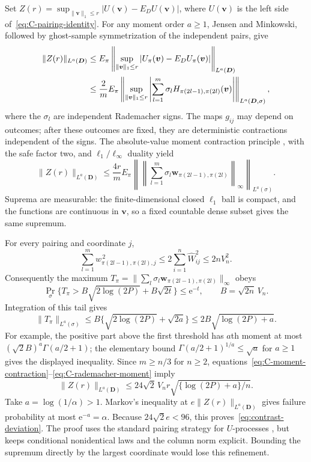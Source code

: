 Set $Z(r)=\sup_{\|\bm{v}\|_1\le r}|U(\bm{v})-E_DU(\bm{v})|$, where $U(\bm{v})$ is the left side of~\eqref{eq:C-pairing-identity}. For any moment order $a\ge1$, Jensen and Minkowski, followed by ghost-sample symmetrization of the independent pairs, give
\begin{align}
 \|Z(r)\|_{L^a(\bm{D})}
 &\le E_\pi\left\|\sup_{\|\bm{v}\|_1\le r}|U_\pi(\bm{v})-E_DU_\pi(\bm{v})|\right\|_{L^a(\bm{D})}\notag\\
 &\le\frac2m E_\pi\left\|\sup_{\|\bm{v}\|_1\le r}
          \left|\sum_{l=1}^m\sigma_l H_{\pi(2l-1),\pi(2l)}(\bm{v})\right|
                    \right\|_{L^a(\bm{D},\sigma)},
 \label{eq:C-moment-symmetrization}
\end{align}
where the $\sigma_l$ are independent Rademacher signs. The maps $g_{ij}$ may depend on outcomes; after these outcomes are fixed, they are deterministic contractions independent of the signs. The absolute-value moment contraction principle \citep[Chapter~4]{LedouxTalagrand1991}, with the safe factor two, and $\ell_1/\ell_\infty$ duality yield
\begin{equation}
 \|Z(r)\|_{L^a(\bm{D})}
 \le\frac{4r}{m}E_\pi
 \left\|\left\|\sum_{l=1}^m\sigma_l \bm{w}_{\pi(2l-1),\pi(2l)}\right\|_\infty
                                             \right\|_{L^a(\sigma)}.
 \label{eq:C-moment-contraction}
\end{equation}
Suprema are measurable: the finite-dimensional closed $\ell_1$ ball is compact, and the functions are continuous in $\bm{v}$, so a fixed countable dense subset gives the same supremum.

For every pairing and coordinate $j$,
\begin{equation}
 \sum_{l=1}^m w_{\pi(2l-1),\pi(2l),j}^{\,2}
 \le2\sum_{i=1}^n\widehat W_{ij}^2\le2nV_n^2.
 \label{eq:C-matching-column-bound}
\end{equation}
Consequently the maximum $T_\pi=\|\sum_l\sigma_l\bm{w}_{\pi(2l-1),\pi(2l)}\|_\infty$ obeys
\[
 \Pr_\sigma\{T_\pi>B\sqrt{2\log(2P)}+B\sqrt{2t}\}\le \mathrm{e}^{-t},
 \qquad B=\sqrt{2n}\,V_n.
\]
Integration of this tail gives
\begin{equation}
 \|T_\pi\|_{L^a(\sigma)}
 \le B\{\sqrt{2\log(2P)}+\sqrt{2a}\}
 \le2B\sqrt{\log(2P)+a}.
 \label{eq:C-rademacher-moment}
\end{equation}
For example, the positive part above the first threshold has $a$th moment at most $(\sqrt2 B)^a\Gamma(a/2+1)$; the elementary bound $\Gamma(a/2+1)^{1/a}\le\sqrt a$ for $a\ge1$ gives the displayed inequality.
Since $m\ge n/3$ for $n\ge2$, equations~\eqref{eq:C-moment-contraction}--\eqref{eq:C-rademacher-moment} imply
\begin{equation}
 \|Z(r)\|_{L^a(\bm{D})}
 \le24\sqrt2\,V_nr\sqrt{\{\log(2P)+a\}/n}.
 \label{eq:C-process-moment}
\end{equation}
Take $a=\log(1/\alpha)>1$. Markov's inequality at $e\|Z(r)\|_{L^a(\bm{D})}$ gives failure probability at most $\mathrm{e}^{-a}=\alpha$. Because $24\sqrt2 e<96$, this proves~\eqref{eq:contrast-deviation}. The proof uses the standard pairing strategy for $U$-processes \citep{ClemencconEtAl2008}, but keeps conditional nonidentical laws and the column norm explicit. Bounding the supremum directly by the largest coordinate would lose this refinement.

